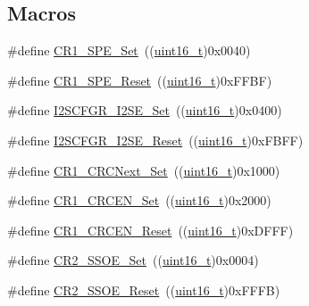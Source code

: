 \subsection*{Macros}
\begin{DoxyCompactItemize}
\item 
\#define \hyperlink{group___s_p_i___private___defines_ga74286f403309d32b56fed10aba2ebf91}{C\+R1\+\_\+\+S\+P\+E\+\_\+\+Set}~((\hyperlink{_p_e___types_8h_a1f1825b69244eb3ad2c7165ddc99c956}{uint16\+\_\+t})0x0040)
\item 
\#define \hyperlink{group___s_p_i___private___defines_ga7074d384e7f175968d1497a9275232bf}{C\+R1\+\_\+\+S\+P\+E\+\_\+\+Reset}~((\hyperlink{_p_e___types_8h_a1f1825b69244eb3ad2c7165ddc99c956}{uint16\+\_\+t})0x\+F\+F\+B\+F)
\item 
\#define \hyperlink{group___s_p_i___private___defines_gaded516c1bc1f0cb578174af3e296621b}{I2\+S\+C\+F\+G\+R\+\_\+\+I2\+S\+E\+\_\+\+Set}~((\hyperlink{_p_e___types_8h_a1f1825b69244eb3ad2c7165ddc99c956}{uint16\+\_\+t})0x0400)
\item 
\#define \hyperlink{group___s_p_i___private___defines_ga0ba63ca824d68ed9a84eafd6f4d64a3a}{I2\+S\+C\+F\+G\+R\+\_\+\+I2\+S\+E\+\_\+\+Reset}~((\hyperlink{_p_e___types_8h_a1f1825b69244eb3ad2c7165ddc99c956}{uint16\+\_\+t})0x\+F\+B\+F\+F)
\item 
\#define \hyperlink{group___s_p_i___private___defines_gaed3a2181ca4095a6488cf6c0ad7a29c6}{C\+R1\+\_\+\+C\+R\+C\+Next\+\_\+\+Set}~((\hyperlink{_p_e___types_8h_a1f1825b69244eb3ad2c7165ddc99c956}{uint16\+\_\+t})0x1000)
\item 
\#define \hyperlink{group___s_p_i___private___defines_gae0b545cdda02753c8e8863e883268011}{C\+R1\+\_\+\+C\+R\+C\+E\+N\+\_\+\+Set}~((\hyperlink{_p_e___types_8h_a1f1825b69244eb3ad2c7165ddc99c956}{uint16\+\_\+t})0x2000)
\item 
\#define \hyperlink{group___s_p_i___private___defines_gadd72ac04e7b2ff17053db04d240e17b1}{C\+R1\+\_\+\+C\+R\+C\+E\+N\+\_\+\+Reset}~((\hyperlink{_p_e___types_8h_a1f1825b69244eb3ad2c7165ddc99c956}{uint16\+\_\+t})0x\+D\+F\+F\+F)
\item 
\#define \hyperlink{group___s_p_i___private___defines_gaae3c2720c0b63d7cc26046969a45a6c1}{C\+R2\+\_\+\+S\+S\+O\+E\+\_\+\+Set}~((\hyperlink{_p_e___types_8h_a1f1825b69244eb3ad2c7165ddc99c956}{uint16\+\_\+t})0x0004)
\item 
\#define \hyperlink{group___s_p_i___private___defines_ga475caaaef8732d35e4c6fd3f21dc4e3c}{C\+R2\+\_\+\+S\+S\+O\+E\+\_\+\+Reset}~((\hyperlink{_p_e___types_8h_a1f1825b69244eb3ad2c7165ddc99c956}{uint16\+\_\+t})0x\+F\+F\+F\+B)

\end{DoxyCompactItemize}
